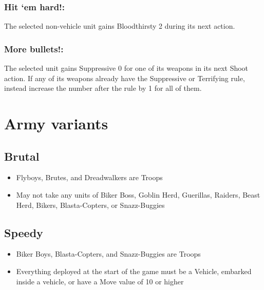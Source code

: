 \documentclass[landscape]{extarticle}
\begin{document}
\subsubsection*{Hit ‘em hard!:} The selected non-vehicle unit gains Bloodthirsty 2 during its next action.

\subsubsection*{More bullets!:} The selected unit gains Suppressive 0 for one of its weapons in its next Shoot action. If any of its weapons already have the Suppressive or Terrifying rule, instead increase the number after the rule by 1 for all of them.


\section*{Army variants}
\subsection*{Brutal}
\begin{itemize}
    \item Flyboys, Brutes, and Dreadwalkers are Troops
    \item May not take any units of Biker Boss, Goblin Herd, Guerillas, Raiders, Beast Herd, Bikers, Blasta-Copters, or Snazz-Buggies
\end{itemize}

\subsection*{Speedy}
\begin{itemize}
    \item Biker Boys, Blasta-Copters, and Snazz-Buggies are Troops
    \item Everything deployed at the start of the game must be a Vehicle, embarked inside a vehicle, or have a Move value of 10 or higher
\end{itemize}




\pagebreak
\end{document}
